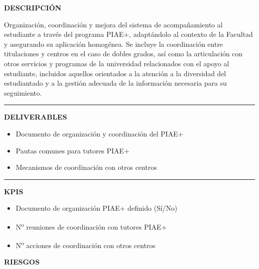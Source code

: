 \documentclass[11pt,a4paper]{scrreprt}
\newcommand{\fieldlabel}[1]{%
  {\footnotesize\sffamily\bfseries\color{mutedcolor}\MakeUppercase{#1}}\par\nopagebreak[4]
}
\newcommand{\fieldsep}{\vspace{3pt}\noindent\textcolor{bordercolor}{\rule{\linewidth}{0.4pt}}\vspace{3pt}\par}
\begin{document}
\begin{tcolorbox}[pabox={e360color}{PA2.1 \enspace\textbullet\enspace Organización y coordinación del sistema de acompañamiento al estudiante (PIAE+)}]

\fieldlabel{Descripci\'on}
{\small Organización, coordinación y mejora del sistema de acompañamiento al estudiante a través del programa PIAE+, adaptándolo al contexto de la Facultad y asegurando su aplicación homogénea. Se incluye la coordinación entre titulaciones y centros en el caso de dobles grados, así como la articulación con otros servicios y programas de la universidad relacionados con el apoyo al estudiante, incluidos aquellos orientados a la atención a la diversidad del estudiantado y a la gestión adecuada de la información necesaria para su seguimiento.  }\par
\fieldsep
\fieldlabel{Deliverables}
{\small \begin{itemize}[noitemsep,topsep=2pt]
\item Documento de organización y coordinación del PIAE+
\item Pautas comunes para tutores PIAE+
\item Mecanismos de coordinación con otros centros
\end{itemize}}\par
\fieldsep
\fieldlabel{KPIs}
{\small \begin{itemize}[noitemsep,topsep=2pt]
\item Documento de organización PIAE+ definido (Sí/No)
\item N\textsuperscript{o} reuniones de coordinación con tutores PIAE+
\item N\textsuperscript{o} acciones de coordinación con otros centros
\end{itemize}}\par
\end{tcolorbox}
\begin{tcolorbox}[riskbox]
{\footnotesize\sffamily\bfseries\color{red!50!black} RIESGOS}\par{}
\end{tcolorbox}
\end{document}
